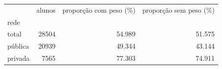 \begin{tabular}{lrrr}
\toprule
 & alunos & proporção com peso (\%) & proporção sem peso (\%) \\
rede &  &  &  \\
\midrule
total & 28504 & 54.989 & 51.575 \\
pública & 20939 & 49.344 & 43.144 \\
privada & 7565 & 77.303 & 74.911 \\
\bottomrule
\end{tabular}
